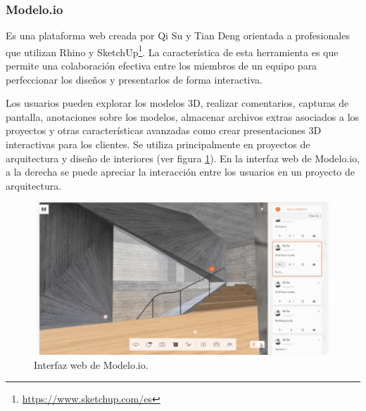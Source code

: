 \subsubsection{Modelo.io}
 Es una plataforma web creada por Qi Su y Tian Deng  \citep{Modelo.io2018} orientada a profesionales que utilizan Rhino y SketchUp\footnote{\url{https://www.sketchup.com/es}}. La característica de esta herramienta es que permite una colaboración efectiva entre los miembros de un equipo para perfeccionar los diseños y presentarlos de forma interactiva.

Los usuarios pueden explorar los modelos 3D, realizar comentarios, capturas de pantalla, anotaciones sobre los modelos, almacenar archivos extras asociados a los proyectos y otras características avanzadas como crear presentaciones 3D interactivas para los clientes. 
Se utiliza principalmente en   proyectos de arquitectura y diseño de interiores (ver figura \ref{fig:modelo.io}). En la interfaz web de \Gls{Modelo.io}, a la derecha se puede apreciar la interacción entre los usuarios \citep{Anthony2016} en un proyecto de arquitectura.

\begin{figure}[h]
\includegraphics[width=14cm]{Img/Desarrollo/modeloio.jpg}
\centering
\caption{\footnotesize{Interfaz web de Modelo.io.}}
\label{fig:modelo.io}
\end{figure}





